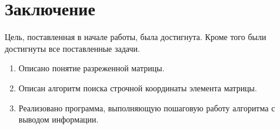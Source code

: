\chapter*{Заключение}

Цель, поставленная в начале работы, была достигнута. 
Кроме того были достигнуты все поставленные задачи.
\begin{enumerate}
	\item Описано понятие разреженной матрицы.
	\item Описан алгоритм поиска строчной координаты элемента матрицы.
	\item Реализовано программа, выполняющую пошаговую работу алгоритма с выводом информации.
\end{enumerate}